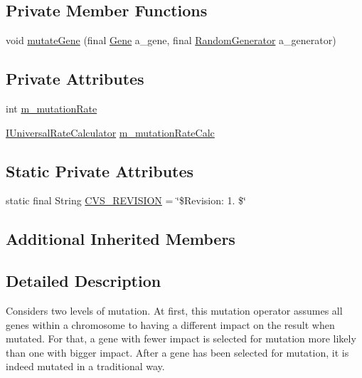 \subsection*{Private Member Functions}
\begin{DoxyCompactItemize}
\item 
void \hyperlink{classorg_1_1jgap_1_1impl_1_1_two_way_mutation_operator_a6043c8f3520437194e851b9a1b3cfc7c}{mutate\-Gene} (final \hyperlink{interfaceorg_1_1jgap_1_1_gene}{Gene} a\-\_\-gene, final \hyperlink{interfaceorg_1_1jgap_1_1_random_generator}{Random\-Generator} a\-\_\-generator)
\end{DoxyCompactItemize}
\subsection*{Private Attributes}
\begin{DoxyCompactItemize}
\item 
int \hyperlink{classorg_1_1jgap_1_1impl_1_1_two_way_mutation_operator_a9f751ed8c191fd900a05714a2f4e4d9b}{m\-\_\-mutation\-Rate}
\item 
\hyperlink{interfaceorg_1_1jgap_1_1_i_universal_rate_calculator}{I\-Universal\-Rate\-Calculator} \hyperlink{classorg_1_1jgap_1_1impl_1_1_two_way_mutation_operator_aaf31fb0ac9dfd8b730fe260280ec34ef}{m\-\_\-mutation\-Rate\-Calc}
\end{DoxyCompactItemize}
\subsection*{Static Private Attributes}
\begin{DoxyCompactItemize}
\item 
static final String \hyperlink{classorg_1_1jgap_1_1impl_1_1_two_way_mutation_operator_a73f3278e9f25c5ceaa6ec002c0c409bb}{C\-V\-S\-\_\-\-R\-E\-V\-I\-S\-I\-O\-N} = \char`\"{}\$Revision\-: 1. \$\char`\"{}
\end{DoxyCompactItemize}
\subsection*{Additional Inherited Members}


\subsection{Detailed Description}
Considers two levels of mutation. At first, this mutation operator assumes all genes within a chromosome to having a different impact on the result when mutated. For that, a gene with fewer impact is selected for mutation more likely than one with bigger impact. After a gene has been selected for mutation, it is indeed mutated in a traditional way. 

